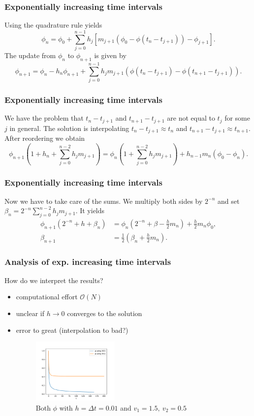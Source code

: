 \documentclass[12pt,a4paper,handout]{beamer}
\theoremstyle{definition}
\theoremstyle{plain}
\begin{document}
\begin{frame}
    \frametitle{Exponentially increasing time intervals}
    Using the quadrature rule yields
    \begin{equation*}
        \phi_n = \phi_0 + \sum_{j=0}^{n-1}h_j[m_{j+1}(\phi_0-\phi(t_n-t_{j+1}))-\phi_{j+1}].
    \end{equation*}
    The update from $\phi_n$ to $\phi_{n+1}$ is given by
    \begin{equation*}
        \phi_{n+1}= \phi_n -h_n\phi_{n+1}+\sum_{j=0}^{n-1}h_jm_{j+1}(\phi(t_n-t_{j+1})-\phi(t_{n+1}-t_{j+1})).
    \end{equation*}
\end{frame}
\begin{frame}
    \frametitle{Exponentially increasing time intervals}
    We have the problem that $t_n-t_{j+1}$ and $t_{n+1}-t_{j+1}$ are not equal to $t_j$ for some $j$ in general. The solution is interpolating $t_n-t_{j+1}\approx t_n$ and $t_{n+1}-t_{j+1}\approx t_{n+1}$. After reordering we obtain
    \begin{equation*}
         \phi_{n+1}(1 + h_n + \sum_{j=0}^{n-2}h_jm_{j+1})=\phi_n(1+\sum_{j=0}^{n-2}h_jm_{j+1})+h_{n-1}m_n(\phi_0-\phi_n).
    \end{equation*}
\end{frame}
\begin{frame}
    \frametitle{Exponentially increasing time intervals}
    Now we have to take care of the sums. We multiply both sides by $2^{-n}$ and set $\beta_n=2^{-n}\sum_{j=0}^{n-2}h_jm_{j+1}$. It yields
    \begin{align*}
    \phi_{n+1}(2^{-n}+h+\beta_n) &= \phi_n(2^{-n}+\beta-\frac{h}{2}m_n)+\frac{h}{2}m_n\phi_0,\\
    \beta_{n+1} &= \frac{1}{2}(\beta_n+\frac{h}{2}m_n).
    \end{align*}
\end{frame}
\begin{frame}
    \frametitle{Analysis of exp. increasing time intervals}
    How do we interpret the results?
    \begin{itemize}[<+->]
        \item computational effort $\mathcal{O}(N)$
        \item unclear if $h\to 0$ converges to the solution
        \item error to great (interpolation to bad?)
        \begin{figure}
            \centering
            \includegraphics[width=0.4\textwidth]{Phidiff}
            \caption{Both $\phi$ with $h=\Delta t=0.01$ and $v_1=1.5,~v_2=0.5$}
        \end{figure}
    \end{itemize}
\end{frame}
\end{document}
